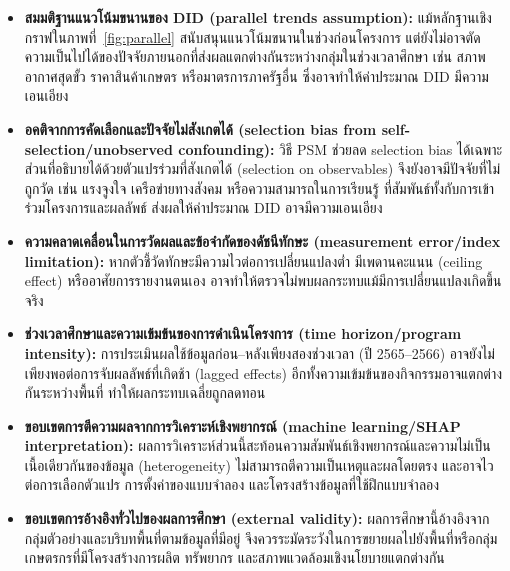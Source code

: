 \begin{itemize}

\item \textbf{สมมติฐานแนวโน้มขนานของ DID (parallel trends assumption):} แม้หลักฐานเชิงกราฟในภาพที่~\ref{fig:parallel} สนับสนุนแนวโน้มขนานในช่วงก่อนโครงการ แต่ยังไม่อาจตัดความเป็นไปได้ของปัจจัยภายนอกที่ส่งผลแตกต่างกันระหว่างกลุ่มในช่วงเวลาศึกษา เช่น สภาพอากาศสุดขั้ว ราคาสินค้าเกษตร หรือมาตรการภาครัฐอื่น ซึ่งอาจทำให้ค่าประมาณ DID มีความเอนเอียง

\item \textbf{อคติจากการคัดเลือกและปัจจัยไม่สังเกตได้ (selection bias from self-selection/unobserved confounding):} วิธี PSM ช่วยลด selection bias ได้เฉพาะส่วนที่อธิบายได้ด้วยตัวแปรร่วมที่สังเกตได้ (selection on observables) จึงยังอาจมีปัจจัยที่ไม่ถูกวัด เช่น แรงจูงใจ เครือข่ายทางสังคม หรือความสามารถในการเรียนรู้ ที่สัมพันธ์ทั้งกับการเข้าร่วมโครงการและผลลัพธ์ ส่งผลให้ค่าประมาณ DID อาจมีความเอนเอียง

\item \textbf{ความคลาดเคลื่อนในการวัดผลและข้อจำกัดของดัชนีทักษะ (measurement error/index limitation):} หากตัวชี้วัดทักษะมีความไวต่อการเปลี่ยนแปลงต่ำ มีเพดานคะแนน (ceiling effect) หรืออาศัยการรายงานตนเอง อาจทำให้ตรวจไม่พบผลกระทบแม้มีการเปลี่ยนแปลงเกิดขึ้นจริง

\item \textbf{ช่วงเวลาศึกษาและความเข้มข้นของการดำเนินโครงการ (time horizon/program intensity):} การประเมินผลใช้ข้อมูลก่อน–หลังเพียงสองช่วงเวลา (ปี 2565–2566) อาจยังไม่เพียงพอต่อการจับผลลัพธ์ที่เกิดช้า (lagged effects) อีกทั้งความเข้มข้นของกิจกรรมอาจแตกต่างกันระหว่างพื้นที่ ทำให้ผลกระทบเฉลี่ยถูกลดทอน

\item \textbf{ขอบเขตการตีความผลจากการวิเคราะห์เชิงพยากรณ์ (machine learning/SHAP interpretation):} ผลการวิเคราะห์ส่วนนี้สะท้อนความสัมพันธ์เชิงพยากรณ์และความไม่เป็นเนื้อเดียวกันของข้อมูล (heterogeneity) ไม่สามารถตีความเป็นเหตุและผลโดยตรง และอาจไวต่อการเลือกตัวแปร การตั้งค่าของแบบจำลอง และโครงสร้างข้อมูลที่ใช้ฝึกแบบจำลอง

\item \textbf{ขอบเขตการอ้างอิงทั่วไปของผลการศึกษา (external validity):} ผลการศึกษานี้อ้างอิงจากกลุ่มตัวอย่างและบริบทพื้นที่ตามข้อมูลที่มีอยู่ จึงควรระมัดระวังในการขยายผลไปยังพื้นที่หรือกลุ่มเกษตรกรที่มีโครงสร้างการผลิต ทรัพยากร และสภาพแวดล้อมเชิงนโยบายแตกต่างกัน

\end{itemize}